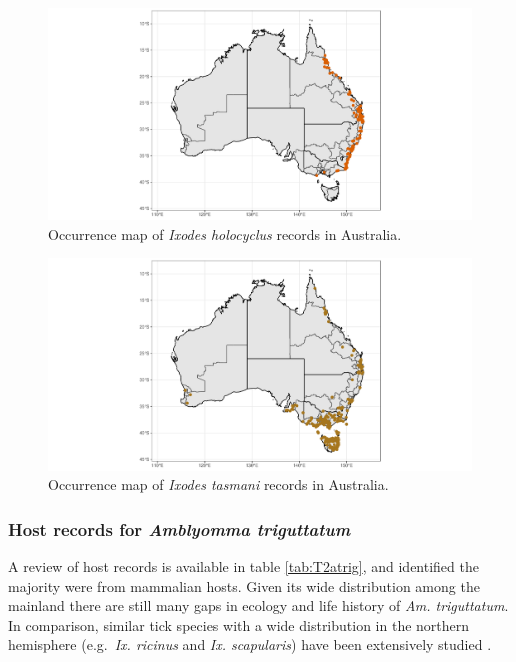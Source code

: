 \documentclass[a4paper, nobind]{templates/ociamthesis}
\begin{document}
\newpage

\begin{figure}
\includegraphics[width=0.95\linewidth]{figures/ms-figs/Ch2-map-ixhol} \caption[Map of \textit{Ixodes holocyclus}.]{Occurrence map of \textit{Ixodes holocyclus} records in Australia.}\label{fig:F2mapixhol}
\end{figure}

\begin{figure}
\includegraphics[width=0.95\linewidth]{figures/ms-figs/Ch2-map-ixtas} \caption[Map of \textit{Ixodes tasmani}.]{Occurrence map of \textit{Ixodes tasmani} records in Australia.}\label{fig:F2mapixtas}
\end{figure}

\newpage

\hypertarget{host-records-for-amblyomma-triguttatum}{%
\subsubsection{\texorpdfstring{Host records for \emph{Amblyomma triguttatum}}{Host records for Amblyomma triguttatum}}\label{host-records-for-amblyomma-triguttatum}}

A review of host records is available in table \ref{tab:T2atrig}, and identified the majority were from mammalian hosts.
Given its wide distribution among the mainland there are still many gaps in ecology and life history of \emph{Am. triguttatum}.
In comparison, similar tick species with a wide distribution in the northern hemisphere (e.g.~\emph{Ix. ricinus} and \emph{Ix. scapularis}) have been extensively studied \autocite{mihalcaRoleRodentsEcology2013,tietjenComparativeEvaluationNorthern2020}.
\end{document}
